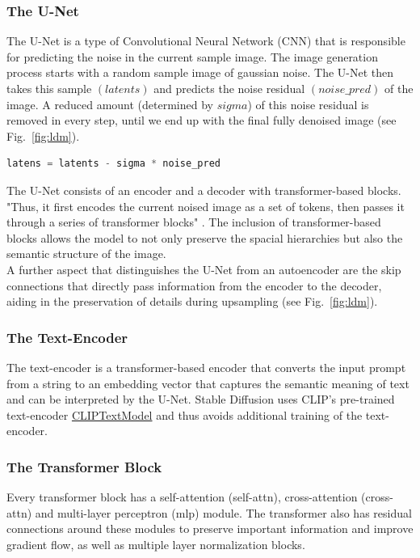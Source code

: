 \subsubsection{The U-Net}
The U-Net \cite{ronneberger2015u} is a type of Convolutional Neural Network (CNN) that is responsible for predicting the noise in the current sample image. The image generation process starts with a random sample image of gaussian noise. The U-Net then takes this sample \((latents)\) and predicts the noise residual \((noise\_pred)\) of the image. 
A reduced amount (determined by \(sigma\)) of this noise residual is removed in every step, until we end up with the final fully denoised image (see Fig.~\ref{fig:ldm}).
\begin{lstlisting}[language=Python]
latens = latents - sigma * noise_pred
\end{lstlisting}
The U-Net consists of an encoder and a decoder with transformer-based blocks. "Thus, it first encodes the current noised image as a set of tokens, then passes it through a series of transformer blocks" \cite{bolya2023tomesd}. The inclusion of transformer-based blocks allows the model to not only preserve the spacial hierarchies but also the semantic structure of the image.\\
A further aspect that distinguishes the U-Net from an autoencoder are the skip connections that directly pass information from the encoder to the decoder, aiding in the preservation of details during upsampling (see Fig.~\ref{fig:ldm}).



\subsubsection{The Text-Encoder}
The text-encoder is a transformer-based encoder that converts the input prompt from a string to an embedding vector that captures the semantic meaning of text and can be interpreted by the U-Net. Stable Diffusion uses CLIP's \cite{radford2021learning} pre-trained text-encoder \href{https://huggingface.co/docs/transformers/model_doc/clip#transformers.CLIPTextModel}{CLIPTextModel} and thus avoids additional training of the text-encoder.



\subsubsection{The Transformer Block}
Every transformer block has a self-attention (self-attn), cross-attention (cross-attn) and multi-layer perceptron (mlp) module.
The transformer also has residual connections around these modules to preserve important information and improve gradient flow, as well as multiple layer normalization blocks.



